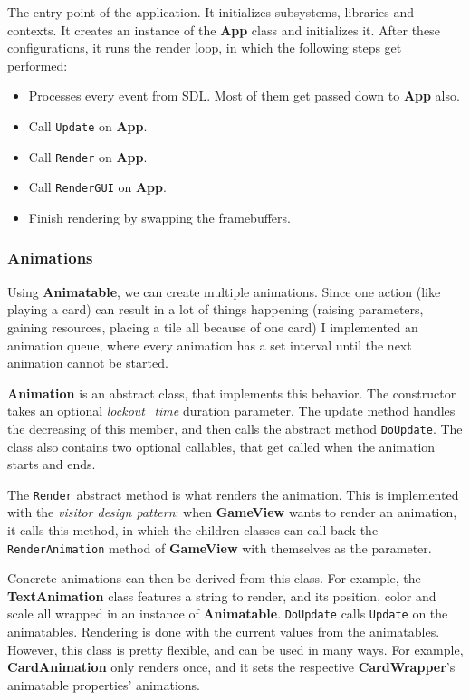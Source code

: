 The entry point of the application. It initializes subsystems, libraries and contexts. It creates an instance of the \textbf{App} class and initializes it. After these configurations, it runs the render loop, in which the following steps get performed:
\begin{itemize}
    \item Processes every event from SDL. Most of them get passed down to \textbf{App} also.
    \item Call \texttt{Update} on \textbf{App}.
    \item Call \texttt{Render} on \textbf{App}.
    \item Call \texttt{RenderGUI} on \textbf{App}.
    \item Finish rendering by swapping the framebuffers.
\end{itemize}

\subsubsection{Animations}

Using \textbf{Animatable}, we can create multiple animations. Since one action (like playing a card) can result in a lot of things happening (raising parameters, gaining resources, placing a tile all because of one card) I implemented an animation queue, where every animation has a set interval until the next animation cannot be started.

\textbf{Animation} is an abstract class, that implements this behavior. The constructor takes an optional \textit{lockout\_time} duration parameter. The update method handles the decreasing of this member, and then calls the abstract method \texttt{DoUpdate}. The class also contains two optional callables, that get called when the animation starts and ends.

The \texttt{Render} abstract method is what renders the animation. This is implemented with the \textit{visitor design pattern}\cite{gamma1994design}: when \textbf{GameView} wants to render an animation, it calls this method, in which the children classes can call back the \texttt{RenderAnimation} method of \textbf{GameView} with themselves as the parameter.

Concrete animations can then be derived from this class. For example, the \textbf{TextAnimation} class features a string to render, and its position, color and scale all wrapped in an instance of \textbf{Animatable}. \texttt{DoUpdate} calls \texttt{Update} on the animatables. Rendering is done with the current values from the animatables. \\
However, this class is pretty flexible, and can be used in many ways. For example, \textbf{CardAnimation} only renders once, and it sets the respective \textbf{CardWrapper}'s animatable properties' animations.


